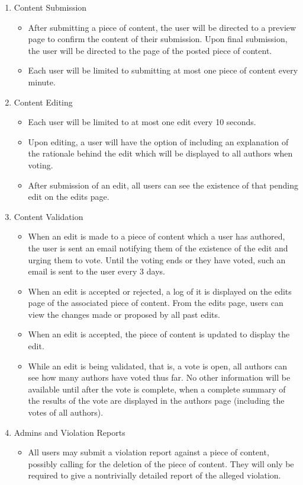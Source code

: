 \documentclass[12pt,letterpaper]{article}
\begin{document}
\begin{enumerate}
\item[] Content Submission
\begin{itemize}
\item After submitting a piece of content, the user will be directed to a preview page to confirm the content of their submission. Upon final submission, the user will be directed to the page of the posted piece of content. 
\item Each user will be limited to submitting at most one piece of content every minute. 
\end{itemize}
\item[] Content Editing
\begin{itemize}
\item Each user will be limited to at most one edit every 10 seconds. 
\item Upon editing, a user will have the option of including an explanation of the rationale behind the edit which will be displayed to all authors when voting.
\item After submission of an edit, all users can see the existence of that pending edit on the edits page. 
\end{itemize}
\item[] Content Validation
\begin{itemize}
\item When an edit is made to a piece of content which a user has authored, the user is sent an email notifying them of the existence of the edit and urging them to vote. Until the voting ends or they have voted, such an email is sent to the user every 3 days. 
\item When an edit is accepted or rejected, a log of it is displayed on the edits page of the associated piece of content. From the edits page, users can view the changes made or proposed by all past edits.
\item When an edit is accepted, the piece of content is updated to display the edit. 
\item While an edit is being validated, that is, a vote is open, all authors can see how many authors have voted thus far. No other information will be available until after the vote is complete, when a complete summary of the results of the vote are displayed in the authors page (including the votes of all authors). 
\end{itemize}
\item[] Admins and Violation Reports
\begin{itemize}
\item All users may submit a violation report against a piece of content, possibly calling for the deletion of the piece of content. They will only be required to give a nontrivially detailed report of the alleged violation.

\end{itemize}
\end{enumerate}
\end{document}
